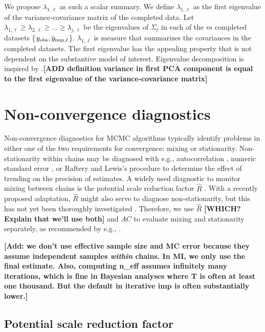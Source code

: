 \documentclass[Royal,times,sageh]{sagej}
\begin{document}
We propose \(\lambda_{1, \ell}\) as such a scalar summary. We define \(\lambda_{1, \ell}\) as the first eigenvalue of the variance-covariance matrix of the completed data. Let \(\lambda_{1, \ell} \geq \lambda_{2, \ell} \geq ... \geq \lambda_{j, \ell}\) be the eigenvalues of \(\Sigma_\ell\) in each of the \(m\) completed datasets \{\(y_{\rm obs}, \dot y_{\rm imp, \ell}\)\}. \(\lambda_{1, \ell}\) is measure that summarizes the covariances in the completed datasets. The first eigenvalue has the appealing property that is not dependent on the substantive model of interest. Eigenvalue decomposition is inspired by \citet{mack03}.\textbf{{[}ADD definition variance in first PCA component is equal to the first eigenvalue of the variance-covariance matrix{]}}

\hypertarget{non-convergence-diagnostics}{%
\section{Non-convergence diagnostics}\label{non-convergence-diagnostics}}

Non-convergence diagnostics for MCMC algorithms typically identify problems in either one of the two requirements for convergence: mixing or stationarity. Non-stationarity within chains may be diagnosed with e.g., autocorrelation \citep[\(AC\);][]{scha97, gelm13}, numeric standard error \citep[`MC error';][]{gewe92}, or Raftery and Lewis's \citeyearpar{raft91} procedure to determine the effect of trending on the precision of estimates. A widely used diagnostic to monitor mixing between chains is the potential scale reduction factor \(\widehat{R}\) \citep[`Gelman-Rubin statistic';][]{gelm92}. With a recently proposed adaptation, \(\widehat{R}\) might also serve to diagnose non-stationarity, but this has not yet been thoroughly investigated \citep{veht19}. Therefore, we use \(\widehat{R}\) \textbf{{[}WHICH? Explain that we'll use both{]}} and \(AC\) to evaluate mixing and stationarity separately, as recommended by e.g., \citet{cowl96}.

\textbf{{[}Add: we don't use effective sample size and MC error because they assume independent samples \emph{within} chains. In MI, we only use the final estimate. Also, computing n\_eff assumes infinitely many iterations, which is fine in Bayesian analyses where T is often at least one thousand. But the default in iterative imp is often substantially lower.{]}}

\hypertarget{potential-scale-reduction-factor}{%
\subsection{Potential scale reduction factor}\label{potential-scale-reduction-factor}}
\end{document}
